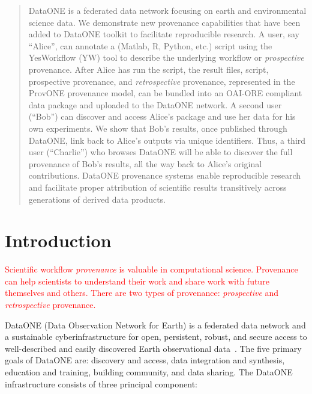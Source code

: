 \documentclass[a4paper]{llncs}
\begin{document}
\begin{abstract}
  DataONE is a federated data network focusing on earth and environmental science data.  We demonstrate new provenance capabilities that have been added to DataONE toolkit to facilitate reproducible research. A user, say ``Alice'', can annotate a (Matlab, R, Python, etc.) script using the YesWorkflow (YW) tool to describe the underlying workflow or \emph{prospective} provenance. After Alice has run the script, the result files, script, prospective provenance, and \emph{retrospective} provenance, represented in the ProvONE provenance model, can be bundled into an OAI-ORE compliant data package and uploaded to the DataONE network. A second user (``Bob'') can discover and access Alice's package and use her data for his own experiments. We show that Bob's results, once published through DataONE, link back to Alice's outputs via unique identifiers. Thus, a third user (``Charlie'') who browses DataONE will be able to discover the full provenance of Bob's results, all the way back to Alice's original contributions.  DataONE provenance systems enable reproducible research and facilitate proper attribution of scientific results transitively across generations of derived data products.  \end{abstract}




\section{Introduction}

\textcolor{red}{Scientific workflow \emph{provenance} is valuable in computational science. Provenance can help scientists to understand their work and share work with future themselves and others. There are two types of provenance: \emph{prospective} and \emph{retrospective} provenance. }

DataONE (Data Observation Network for Earth) is a federated data network and a sustainable cyberinfrastructure for open, persistent, robust, and secure access to well-described and easily discovered Earth observational data~\cite{dataone}. The five primary goals of DataONE are: discovery and access, data integration and synthesis, education and training, building community, and data sharing. The DataONE infrastructure consists of three principal component:
\end{document}
